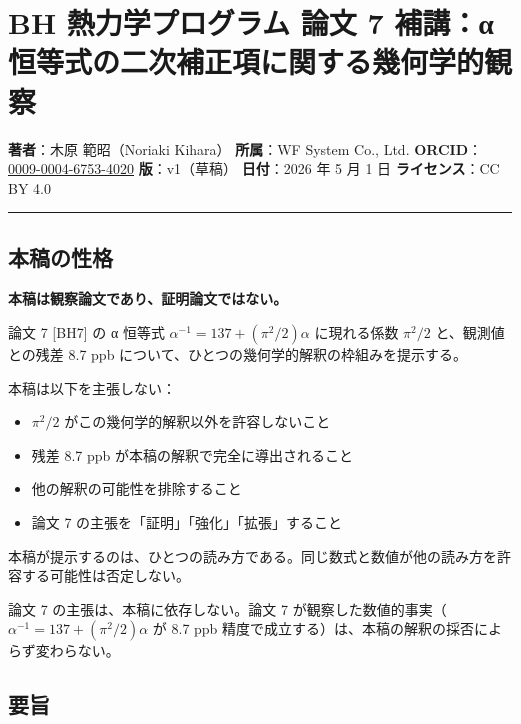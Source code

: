 \documentclass[
]{article}
\author{}
\date{}
\providecommand{\tightlist}{%
  \setlength{\itemsep}{0pt}\setlength{\parskip}{0pt}}
\begin{document}
\section{BH 熱力学プログラム 論文 7 補講：α
恒等式の二次補正項に関する幾何学的観察}\label{bh-ux71b1ux529bux5b66ux30d7ux30edux30b0ux30e9ux30e0-ux8ad6ux6587-7-ux88dcux8b1bux3b1-ux6052ux7b49ux5f0fux306eux4e8cux6b21ux88dcux6b63ux9805ux306bux95a2ux3059ux308bux5e7eux4f55ux5b66ux7684ux89b3ux5bdf}

\textbf{著者}：木原 範昭（Noriaki Kihara） \textbf{所属}：WF System Co.,
Ltd.
\textbf{ORCID}：\href{https://orcid.org/0009-0004-6753-4020}{0009-0004-6753-4020}
\textbf{版}：v1（草稿） \textbf{日付}：2026 年 5 月 1 日
\textbf{ライセンス}：CC BY 4.0

\begin{center}\rule{0.5\linewidth}{0.5pt}\end{center}

\subsection{本稿の性格}\label{ux672cux7a3fux306eux6027ux683c}

\textbf{本稿は観察論文であり、証明論文ではない。}

論文 7 {[}BH7{]} の α 恒等式 \(\alpha^{-1} = 137 + (\pi^2/2)\alpha\)
に現れる係数 \(\pi^2/2\) と、観測値との残差 8.7 ppb
について、ひとつの幾何学的解釈の枠組みを提示する。

本稿は以下を主張しない：

\begin{itemize}
\tightlist
\item
  \(\pi^2/2\) がこの幾何学的解釈以外を許容しないこと
\item
  残差 8.7 ppb が本稿の解釈で完全に導出されること
\item
  他の解釈の可能性を排除すること
\item
  論文 7 の主張を「証明」「強化」「拡張」すること
\end{itemize}

本稿が提示するのは、ひとつの読み方である。同じ数式と数値が他の読み方を許容する可能性は否定しない。

論文 7 の主張は、本稿に依存しない。論文 7
が観察した数値的事実（\(\alpha^{-1} = 137 + (\pi^2/2)\alpha\) が 8.7 ppb
精度で成立する）は、本稿の解釈の採否によらず変わらない。

\subsection{要旨}\label{ux8981ux65e8}
\end{document}
